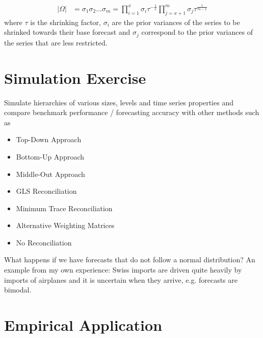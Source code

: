 \documentclass[a4paper,fleqn,11pt]{article}
\begin{document}
\begin{itemize}
    \begin{align*}
    	|\Omega| &= \sigma_1 \sigma_2 \hdots \sigma_m 
    	= \prod_{i = 1}^{x} \sigma_{i}\tau^{-\frac{1}{x}}   \prod_{j = x+1}^{m} \sigma_{j}\tau^{\frac{1}{m-x}}
    \end{align*}
where $\tau$ is the shrinking factor, $\sigma_i$ are the prior variances of the series to be shrinked towards their base forecast and $\sigma_j$ correspond to the prior variances of the series that are less restricted.
\end{itemize}

\clearpage

\section{Simulation Exercise}

Simulate hierarchies of various sizes, levels and time series properties and compare benchmark performance / forecasting accuracy with other methods such as
\begin{itemize}
    \item Top-Down Approach
    \item Bottom-Up Approach
    \item Middle-Out Approach
    \item GLS Reconciliation \cite{Hyndman2011}
    \item Minimum Trace Reconciliation \cite{Wickramasuriya2015}
    \item Alternative Weighting Matrices
    \item No Reconciliation\\
\end{itemize}

What happens if we have forecasts that do not follow a normal distribution? An example from my own experience: Swiss imports are driven quite heavily by imports of airplanes and it is uncertain when they arrive, e.g. forecasts are bimodal.

\clearpage

\section{Empirical Application}
\end{document}
